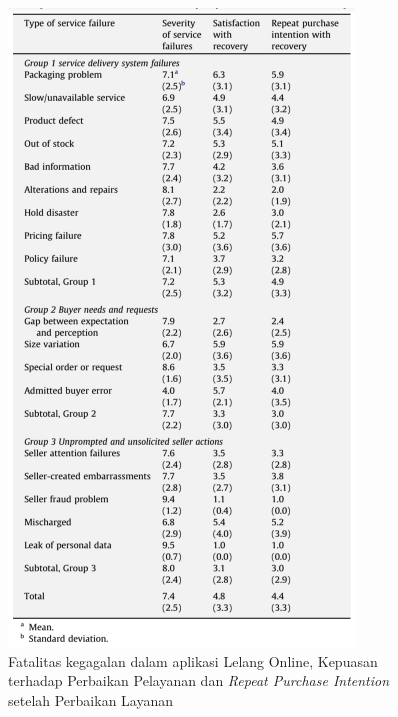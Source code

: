 	  \begin{figure}[H]
        \centering
        \includegraphics[width=\linewidth]{images/bab3/Fatalitas-Kegagalan-Ecommerce.png}
        \caption{Fatalitas kegagalan dalam aplikasi Lelang Online, Kepuasan terhadap Perbaikan Pelayanan dan \textit{Repeat Purchase Intention} setelah Perbaikan Layanan}
        \label{severity-failures}
      \end{figure}
      

